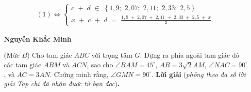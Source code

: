 \begin{multicols}{2}
	\begin{align*}
		(1) \Leftrightarrow \begin{cases}
			c\,\, + \,\,d\,\, \in \,\,\left\{ {1,9;\,\,2,07;\,\,2,11;\,\,2,33;\,\,2,5} \right\}\\
			x\,\, + \,\,c\,\, + \,\,d\,\, = \,\,\frac{{1,9\,\, + \,\,2,07\,\, + \,\,2,11\,\, + \,\,2,33\,\, + \,\,2,5\,\, + \,\,x}}{3}.
		\end{cases}
	\end{align*}
	\begin{flushright}
		\textbf{Nguyễn Khắc Minh}
	\end{flushright}
	{}
	(Mức $B$) Cho tam giác $ABC$ với trọng tâm $G$. Dựng ra phía ngoài tam giác đó các tam giác $ABM$ và $ACN$, sao cho $\angle BAM = 45^\circ$, $AB = 3\sqrt{2}AM$, $\angle NAC = 90^\circ$, và $AC = 3AN$. Chứng minh rằng, $\angle GMN = 90^\circ$.
	\vskip 0.05cm  
	\textbf{Lời giải} (\textit{phỏng theo đa số lời giải Tạp chí đã nhận được từ bạn đọc})\textbf{.}
	\vskip 0.05cm
	

\end{multicols}

